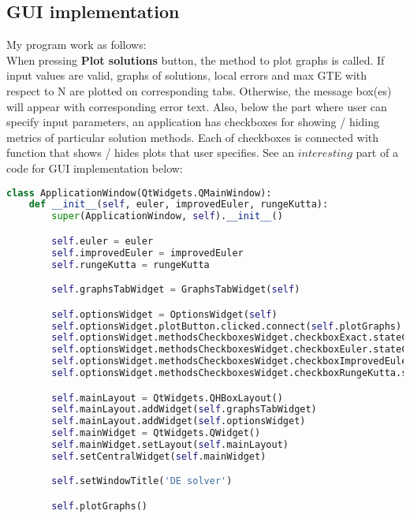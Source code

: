 \documentclass[12pt, a4paper]{article}
\begin{document}
    \subsection{GUI implementation}
    My program work as follows: \\ When pressing \textbf{Plot solutions} button, the method to plot graphs is called. If input values are valid, graphs of solutions, local errors and max GTE with respect to N are plotted on corresponding tabs. Otherwise, the message box(es) will appear with corresponding error text. Also, below the part where user can specify input parameters, an application has checkboxes for showing / hiding metrics of particular solution methods. Each of checkboxes is connected with function that shows / hides plots that user specifies. See an $interesting$ part of a code for GUI implementation below: 
    \\
    \begin{lstlisting}[language=Python, caption=ApplicationWindow class (Main window of GUI)]
class ApplicationWindow(QtWidgets.QMainWindow):
    def __init__(self, euler, improvedEuler, rungeKutta):
        super(ApplicationWindow, self).__init__()

        self.euler = euler
        self.improvedEuler = improvedEuler
        self.rungeKutta = rungeKutta

        self.graphsTabWidget = GraphsTabWidget(self)

        self.optionsWidget = OptionsWidget(self)
        self.optionsWidget.plotButton.clicked.connect(self.plotGraphs)
        self.optionsWidget.methodsCheckboxesWidget.checkboxExact.stateChanged.connect(self.plotGraphs)
        self.optionsWidget.methodsCheckboxesWidget.checkboxEuler.stateChanged.connect(self.plotGraphs)
        self.optionsWidget.methodsCheckboxesWidget.checkboxImprovedEuler.stateChanged.connect(self.plotGraphs)
        self.optionsWidget.methodsCheckboxesWidget.checkboxRungeKutta.stateChanged.connect(self.plotGraphs)

        self.mainLayout = QtWidgets.QHBoxLayout()
        self.mainLayout.addWidget(self.graphsTabWidget)
        self.mainLayout.addWidget(self.optionsWidget)
        self.mainWidget = QtWidgets.QWidget()
        self.mainWidget.setLayout(self.mainLayout)
        self.setCentralWidget(self.mainWidget)

        self.setWindowTitle('DE solver')

        self.plotGraphs()
    \end{lstlisting}
    
\end{document}
